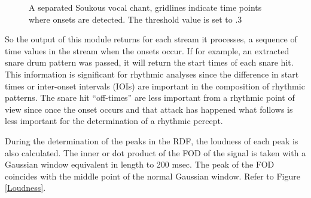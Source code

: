 \begin{figure}[thp]
  \begin{center}
    \caption{A separated Soukous vocal chant, gridlines indicate time
      points where onsets are detected. The threshold value is set to .3}
    \label{vocalsampleonsets}
  \end{center}
\end{figure}

So the output of this module returns for each stream it processes, 
a sequence of time values in the stream when the onsets occur. If for
example, an extracted snare drum pattern was passed, 
it will return the start times of each snare hit. This information 
is significant for rhythmic analyses since the difference in start
times or inter-onset intervals (IOIs) are important in the
composition of rhythmic patterns. The snare hit ``off-times'' are less
important from a rhythmic point of view since once the onset occurs
and that attack has happened what follows is less important for the
determination of a rhythmic percept.

During the determination of the peaks in the RDF, the loudness of each
peak is also calculated. The inner or dot product of the FOD
of the signal is taken with a Gaussian window equivalent in length to 
200 msec. The peak of the FOD coincides with the middle point 
of the normal Gaussian window. Refer to Figure \ref{Loudness}.

